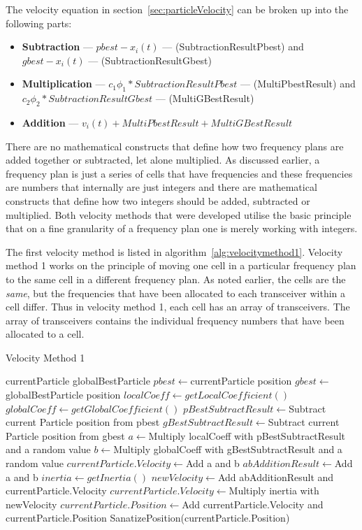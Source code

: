 The velocity equation in section~\ref{sec:particleVelocity} can be broken up into the following parts:
\label{lst:velocitybreakup}
\begin{itemize}
\item \textbf{Subtraction} --- $pbest - x_i(t)$ --- (SubtractionResultPbest) and $gbest - x_i(t)$ --- (SubtractionResultGbest)
\item \textbf{Multiplication} --- $c_1\phi_1 * SubtractionResultPbest$ --- (MultiPbestResult) and $c_2\phi_2 * SubtractionResultGbest$ --- (MultiGBestResult)
\item \textbf{Addition} --- $v_i(t) + MultiPbestResult + MultiGBestResult$
\end{itemize}
There are no mathematical constructs that define how two frequency plans are added together or subtracted, let alone multiplied. As discussed earlier, a frequency plan is just a series of cells that have frequencies and these frequencies are numbers that internally are just integers and there are mathematical constructs that define how two integers should be added, subtracted or multiplied. Both velocity methods that were developed utilise the basic principle that on a fine granularity of a frequency plan one is merely working with integers.


The first velocity method is listed in algorithm~\ref{alg:velocitymethod1}. Velocity method 1 works on the principle of moving one cell in a particular frequency plan to the same cell in a different frequency plan. As noted earlier, the cells are the \emph{same}, but the frequencies that have been allocated to each transceiver within a cell differ. Thus in velocity method 1, each cell has an array of transceivers. The array of transceivers contains the individual frequency numbers that have been allocated to a cell.
\begin{algorithm}[H]
\caption{Velocity Method 1}
\label{alg:velocitymethod1}
	\begin{algorithmic}[1]
	\Require currentParticle
	\Require globalBestParticle
	\State $pbest \leftarrow $currentParticle position
	\State $gbest \leftarrow $globalBestParticle position
	\State $localCoeff \leftarrow getLocalCoefficient()$
	\State $globalCoeff \leftarrow getGlobalCoefficient()$
	\State $pBestSubtractResult \leftarrow $Subtract current Particle position from pbest
	\State $gBestSubtractResult \leftarrow $Subtract current Particle position from gbest
	\State $a \leftarrow $Multiply localCoeff with pBestSubtractResult and a random value
	\State $b \leftarrow $Multiply globalCoeff with gBestSubtractResult and a random value
		\State $currentParticle.Velocity \leftarrow $Add a and b
	\Else
		\State $abAdditionResult \leftarrow $Add a and b
		\State $inertia \leftarrow getInertia()$
		\State $newVelocity \leftarrow $Add abAdditionResult and currentParticle.Velocity
		\State $currentParticle.Velocity \leftarrow $Multiply inertia with newVelocity
	\EndIf
	\State $currentParticle.Position \leftarrow $Add currentParticle.Velocity and currentParticle.Position
	\State SanatizePosition(currentParticle.Position)
	\end{algorithmic}
\end{algorithm}

